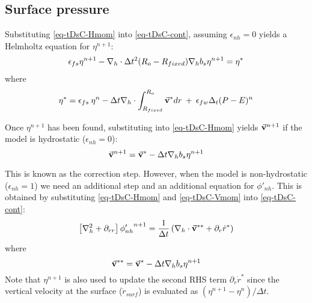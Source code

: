 \subsection{Surface pressure}

Substituting \ref{eq-tDsC-Hmom} into \ref{eq-tDsC-cont}, assuming
$\epsilon_{nh} = 0$ yields a Helmholtz equation for ${\eta}^{n+1}$:
\begin{eqnarray}
\epsilon_{fs} {\eta}^{n+1} -
{\bf \nabla}_h \cdot \Delta t^2 (R_o-R_{fixed})
{\bf \nabla}_h b_s {\eta}^{n+1}
= {\eta}^*
\label{eq-solve2D}
\end{eqnarray}
where
\begin{eqnarray}
{\eta}^* = \epsilon_{fs} \: {\eta}^{n} -
\Delta t {\bf \nabla}_h \cdot \int_{R_{fixed}}^{R_o} \vec{\bf v}^* dr
\: + \: \epsilon_{fw} \Delta_t (P-E)^{n} 
\label{eq-solve2D_rhs}
\end{eqnarray}



Once ${\eta}^{n+1}$ has been found, substituting into
\ref{eq-tDsC-Hmom} yields $\vec{\bf v}^{n+1}$ if the model is
hydrostatic ($\epsilon_{nh}=0$):
$$
\vec{\bf v}^{n+1} = \vec{\bf v}^{*}
- \Delta t {\bf \nabla}_h b_s {\eta}^{n+1}
$$

This is known as the correction step. However, when the model is
non-hydrostatic ($\epsilon_{nh}=1$) we need an additional step and an
additional equation for $\phi'_{nh}$. This is obtained by substituting
\ref{eq-tDsC-Hmom} and \ref{eq-tDsC-Vmom} into
\ref{eq-tDsC-cont}:
\begin{equation}
\left[ {\bf \nabla}_h^2 + \partial_{rr} \right] {\phi'_{nh}}^{n+1}
= \frac{1}{\Delta t} \left(
{\bf \nabla}_h \cdot \vec{\bf v}^{**} + \partial_r \dot{r}^* \right)
\end{equation}
where
\begin{displaymath}
\vec{\bf v}^{**} = \vec{\bf v}^* - \Delta t {\bf \nabla}_h b_s {\eta}^{n+1}
\end{displaymath}
Note that $\eta^{n+1}$ is also used to update the second RHS term
$\partial_r \dot{r}^* $ since
the vertical velocity at the surface ($\dot{r}_{surf}$) 
is evaluated as $(\eta^{n+1} - \eta^n) / \Delta t$.

